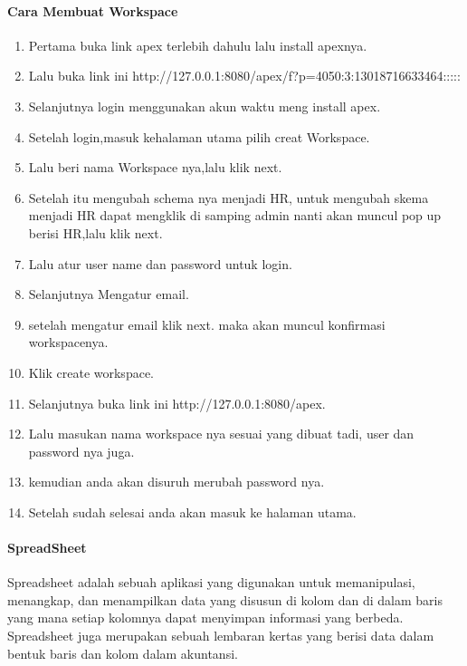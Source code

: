 \documentclass[a4paper,12pt]{report}
\begin{document}
\paragraph{Cara Membuat Workspace}
\begin{enumerate}
\item Pertama buka link apex terlebih dahulu lalu install apexnya.\\
\item Lalu buka link ini http://127.0.0.1:8080/apex/f?p=4050:3:13018716633464:::::\\
\item Selanjutnya login menggunakan akun waktu meng install apex.\\
\item Setelah login,masuk kehalaman utama pilih creat Workspace.\\
\item Lalu beri nama Workspace nya,lalu klik next.\\
\item Setelah itu mengubah schema nya menjadi HR, untuk mengubah skema menjadi HR dapat mengklik di samping admin nanti akan muncul pop up berisi HR,lalu klik next.\\
\item Lalu atur user name dan password untuk login.\\
\item Selanjutnya Mengatur email.\\
\item setelah mengatur email klik next. maka akan muncul konfirmasi workspacenya.\\
\item Klik create workspace.\\
\item Selanjutnya buka link ini http://127.0.0.1:8080/apex.\\
\item  Lalu masukan nama workspace nya sesuai yang dibuat tadi, user dan password nya juga.\\
\item kemudian anda akan disuruh merubah password nya.\\
\item Setelah sudah selesai anda akan masuk ke halaman utama.\\  
\end{enumerate}
\paragraph{SpreadSheet}
Spreadsheet adalah sebuah aplikasi yang digunakan untuk memanipulasi, menangkap, dan menampilkan data yang disusun di kolom dan di dalam baris yang mana setiap kolomnya dapat menyimpan informasi yang berbeda. Spreadsheet juga merupakan sebuah lembaran kertas yang berisi data dalam bentuk baris dan kolom dalam akuntansi.\\
\end{document}
